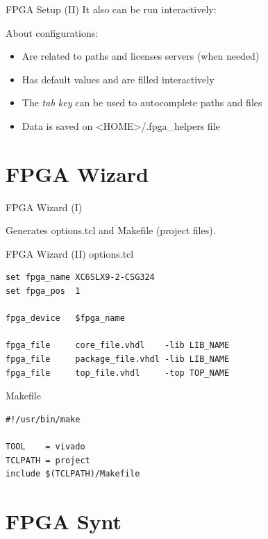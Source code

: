 \documentclass{beamer}
\begin{document}
\begin{frame}[fragile]{FPGA Setup (II)}
  It also can be run interactively:
  \scriptsize
  
  \normalsize
  About configurations:
  \begin{itemize}
    \item Are related to paths and licenses servers (when needed)
    \item Has default values and are filled interactively
    \item The \textit{tab key} can be used to autocomplete paths and files
    \item Data is saved on <HOME>/.fpga\_helpers file
  \end{itemize}
\end{frame}


\section{FPGA Wizard}

\begin{frame}[fragile]{FPGA Wizard (I)}
  \begin{block}{}
    Generates options.tcl and Makefile (project files).
  \end{block}{}
  \tiny
  
\end{frame}

\begin{frame}[fragile]{FPGA Wizard (II)}
  \scriptsize
  options.tcl
  \begin{verbatim}
set fpga_name XC6SLX9-2-CSG324
set fpga_pos  1

fpga_device   $fpga_name

fpga_file     core_file.vhdl    -lib LIB_NAME
fpga_file     package_file.vhdl -lib LIB_NAME
fpga_file     top_file.vhdl     -top TOP_NAME
  \end{verbatim}
  Makefile
  \begin{verbatim}
#!/usr/bin/make

TOOL    = vivado
TCLPATH = project
include $(TCLPATH)/Makefile
  \end{verbatim}
\end{frame}


\section{FPGA Synt}
\end{document}
